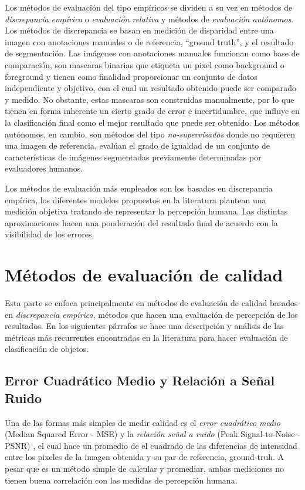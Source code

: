 Los métodos de evaluación del tipo empíricos se dividen a su vez en métodos de \emph{discrepancia empírica} o \emph{evaluación relativa} y métodos de \emph{evaluación autónomos}. Los métodos de discrepancia se basan en medición de disparidad entre una imagen con anotaciones manuales o de referencia, ``ground truth'', y el resultado de segmentación. Las imágenes con anotaciones manuales funcionan como base de comparación, son mascaras binarias que etiqueta un pixel como background o foreground y tienen como finalidad proporcionar un conjunto de datos independiente y objetivo, con el cual un resultado obtenido puede ser comparado y medido. No obstante, estas mascaras son construidas manualmente, por lo que tienen en forma inherente un cierto grado de error e incertidumbre, que influye en la clasificación final como el mejor resultado que puede ser obtenido. Los métodos autónomos, en cambio, son métodos del tipo \emph{no-supervisados} \cite{zhang_image_2008} donde no requieren una imagen de referencia, evalúan el grado de igualdad de un conjunto de características de imágenes segmentadas previamente determinadas por evaluadores humanos.

Los métodos de evaluación más empleados son los basados en discrepancia empírica, los diferentes modelos propuestos en la literatura plantean una medición objetiva tratando de representar la percepción humana. Las distintas aproximaciones hacen una ponderación del resultado final de acuerdo con la visibilidad de los errores.



\section{Métodos de evaluación de calidad}

Esta parte se enfoca principalmente en métodos de evaluación de calidad basados en \emph{discrepancia empírica}, métodos que hacen una evaluación de percepción de los resultados. En los siguientes párrafos se hace una descripción y análisis de las métricas más recurrentes encontradas en la literatura para hacer evaluación de clasificación de objetos. 

\subsection{Error Cuadrático Medio y Relación a Señal Ruido}

Una de las formas más simples de medir calidad es el \emph{error cuadrático medio} (Median Squared Error - MSE) y la \emph{relación señal a ruido} (Peak Signal-to-Noise - PSNR) \cite{park_benchmark_2013} \cite{park_benchmark_2013}, el cual hace un promedio de el cuadrado de las diferencias de intensidad entre los pixeles de la imagen obtenida y su par de referencia, ground-truh. A pesar que es un método simple de calcular y promediar, ambas mediciones no tienen buena correlación con las medidas de percepción humana.

